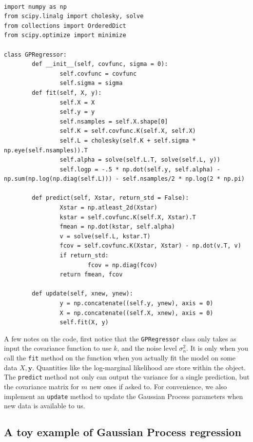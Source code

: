 \documentclass[10pt,a4paper,twoside]{book}
\begin{document}
\begin{verbatim}
               
import numpy as np
from scipy.linalg import cholesky, solve
from collections import OrderedDict
from scipy.optimize import minimize

class GPRegressor:
        def __init__(self, covfunc, sigma = 0):
                self.covfunc = covfunc
                self.sigma = sigma
        def fit(self, X, y):
                self.X = X
                self.y = y
                self.nsamples = self.X.shape[0]
                self.K = self.covfunc.K(self.X, self.X)
                self.L = cholesky(self.K + self.sigma * np.eye(self.nsamples)).T
                self.alpha = solve(self.L.T, solve(self.L, y))
                self.logp = -.5 * np.dot(self.y, self.alpha) - np.sum(np.log(np.diag(self.L))) - self.nsamples/2 * np.log(2 * np.pi)

        def predict(self, Xstar, return_std = False):
                Xstar = np.atleast_2d(Xstar)
                kstar = self.covfunc.K(self.X, Xstar).T
                fmean = np.dot(kstar, self.alpha)
                v = solve(self.L, kstar.T)
                fcov = self.covfunc.K(Xstar, Xstar) - np.dot(v.T, v)
                if return_std:
                        fcov = np.diag(fcov)
                return fmean, fcov

        def update(self, xnew, ynew):
                y = np.concatenate((self.y, ynew), axis = 0)
                X = np.concatenate((self.X, xnew), axis = 0)
                self.fit(X, y)
\end{verbatim}

A few notes on the code, first notice that the \texttt{GPRegressor} class only takes as input the covariance function to use $k$, and the noise level $\sigma_n^2$. It is only when you call the \texttt{fit} method on the function when you actually fit the model on some data $X, \boldsymbol{y}$. Quantities like the log-marginal likelihood are store within the object. The \texttt{predict} method not only can output the variance for a single prediction, but the covariance matrix for $m$ new ones if asked to. For convenience, we also implement an \texttt{update} method to update the Gaussian Process parameters when new data is available to us.

\subsection{A toy example of Gaussian Process regression}
\end{document}
